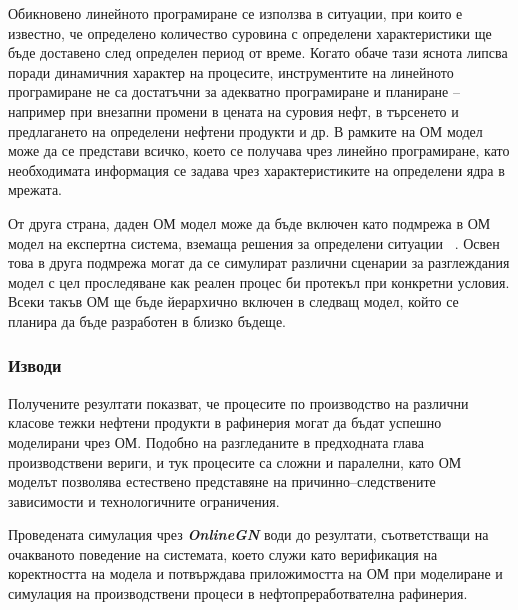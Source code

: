 Обикновено линейното програмиране се използва в ситуации, при които е известно, че определено количество суровина с определени характеристики ще бъде доставено след определен период от време. Когато обаче тази яснота липсва поради динамичния характер на процесите, инструментите на линейното програмиране не са достатъчни за адекватно програмиране и планиране -- например при внезапни промени в цената на суровия нефт, в търсенето и предлагането на определени нефтени продукти и др. В рамките на ОМ модел може да се представи всичко, което се получава чрез линейно програмиране, като необходимата информация се задава чрез характеристиките на определени ядра в мрежата.

От друга страна, даден ОМ модел може да бъде включен като подмрежа в ОМ модел на експертна система, вземаща решения за определени ситуации ~\cite{GN-IFS}. Освен това в друга подмрежа могат да се симулират различни сценарии за разглеждания модел с цел проследяване как реален процес би протекъл при конкретни условия. Всеки такъв ОМ ще бъде йерархично включен в следващ модел, който се планира да бъде разработен в близко бъдеще.


\subsubsection{Изводи}

\hspace*{2.5em}Получените резултати показват, че процесите по производство на различни класове тежки нефтени продукти в рафинерия могат да бъдат успешно моделирани чрез ОМ. Подобно на разгледаните в предходната глава производствени вериги, и тук процесите са сложни и паралелни, като ОМ моделът позволява естествено представяне на причинно--следствените зависимости и технологичните ограничения.

Проведената симулация чрез \textbf{\textit{OnlineGN}} води до резултати, съответстващи на очакваното поведение на системата, което служи като верификация на коректността на модела и потвърждава приложимостта на ОМ при моделиране и симулация на производствени процеси в нефтопреработвателна рафинерия.
